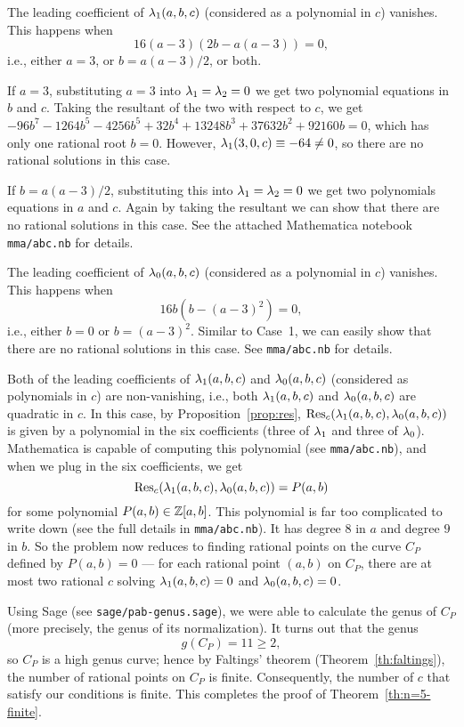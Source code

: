 \begin{case}
  The leading coefficient of $\lambda_1(a, b, c)$ (considered as a
  polynomial in $c$) vanishes. This happens when
  \[
  16(a - 3)(2b - a(a-3)) = 0,
  \]
  i.e., either $a = 3$, or $b = a(a-3)/2$, or both.

  If $a = 3$, substituting $a = 3$ into $\lambda_1 = \lambda_2 = 0$ we get two
  polynomial equations in $b$ and $c$. Taking the resultant of the two
  with respect to $c$, we get $- 96b^7 - 1264b^5 - 4256b^5 + 32b^4 +
  13248b^3 + 37632b^2 + 92160b = 0$, which has only one rational root
  $b = 0$. However, $\lambda_1(3, 0, c) \equiv -64 \ne 0$, so there are no
  rational solutions in this case.

  If $b = a(a-3)/2$, substituting this into $\lambda_1 = \lambda_2 = 0$ we get
  two polynomials equations in $a$ and $c$. Again by taking the
  resultant we can show that there are no rational solutions in this
  case. See the attached Mathematica notebook \texttt{mma/abc.nb} for
  details.
\end{case}

\begin{case}
  The leading coefficient of $\lambda_0(a, b, c)$ (considered as a
  polynomial in $c$) vanishes. This happens when
  \[
  16b(b - (a-3)^2) = 0,
  \]
  i.e., either $b = 0$ or $b = (a - 3)^2$. Similar to Case~1, we can
  easily show that there are no rational solutions in this case. See
  \texttt{mma/abc.nb} for details.
\end{case}

\begin{case}
  Both of the leading coefficients of $\lambda_1(a, b, c)$ and $\lambda_0(a, b,
  c)$ (considered as polynomials in $c$) are non-vanishing, i.e., both
  $\lambda_1(a, b, c)$ and $\lambda_0(a, b, c)$ are quadratic in $c$. In this
  case, by Proposition~\ref{prop:res}, $\mathrm{Res}_c(\lambda_1(a, b, c), \lambda_0(a,
  b, c))$ is given by a polynomial in the six coefficients (three of
  $\lambda_1$ and three of $\lambda_0$). Mathematica is capable of computing
  this polynomial (see \texttt{mma/abc.nb}), and when we plug in the
  six coefficients, we get
  \[
  \label{eq:pab}
  \mathrm{Res}_c(\lambda_1(a, b, c), \lambda_0(a, b, c)) = P(a, b)
  \]
  for some polynomial $P(a, b) \in \mathbb{Z}[a, b]$. This polynomial is far
  too complicated to write down (see the full details in
  \texttt{mma/abc.nb}). It has degree $8$ in $a$ and degree $9$ in
  $b$. So the problem now reduces to finding rational points on the
  curve $C_P$ defined by $P(a, b) = 0$ --- for each rational point
  $(a, b)$ on $C_P$, there are at most two rational $c$ solving
  $\lambda_1(a, b, c) = 0$ and $\lambda_0(a, b, c) = 0$.

  Using Sage (see \texttt{sage/pab-genus.sage}), we were able to
  calculate the genus of $C_P$ (more precisely, the genus of its
  normalization). It turns out that the genus
  \[
  g(C_P) = 11 \ge 2,
  \]
  so $C_P$ is a high genus curve; hence by Faltings' theorem
  (Theorem~\ref{th:faltings}), the number of rational points on $C_P$
  is finite. Consequently, the number of $c$ that satisfy our
  conditions is finite. This completes the proof of
  Theorem~\ref{th:n=5-finite}.
\end{case}

